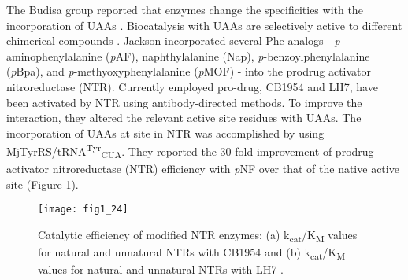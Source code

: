 \begin{refsection}
The Budisa group reported that enzymes change the specificities with the
incorporation of UAAs \cite{Budisa2006}. Biocatalysis with UAAs
are selectively active to different chimerical compounds \cite{Jackson2006a}.
Jackson  incorporated several Phe analogs -
\emph{p}-aminophenylalanine (\emph{p}AF), naphthylalanine (Nap),
\emph{p}-benzoylphenylalanine (\emph{p}Bpa), and \emph{p}-methyoxyphenylalanine
(\emph{p}MOF) - into the prodrug activator nitroreductase (NTR). Currently
employed pro-drug, CB1954 and LH7, have been activated by NTR using
antibody-directed methods. To improve the interaction, they altered the
relevant active site residues with UAAs. The incorporation of UAAs at site in
NTR was accomplished by using
MjTyrRS/tRNA\textsuperscript{Tyr}\textsubscript{CUA}. They reported the 30-fold
improvement of prodrug activator nitroreductase (NTR) efficiency with
\emph{p}NF over that of the native active site\cite{Jackson2006a} (Figure
\ref{fig:selectivity-example}).
\begin{figure}[htbp] \centering \texttt{[image: fig1\_24]}
    \caption[Catalytic efficiency of modified NTR enzymes: (a)
        k\textsubscript{cat}/K\textsubscript{M} values for natural and
        unnatural NTRs with CB1954 and (b)
        k\textsubscript{cat}/K\textsubscript{M} values for natural and
    unnatural NTRs with LH7.]{Catalytic efficiency of modified NTR enzymes: (a)
        k\textsubscript{cat}/K\textsubscript{M} values for natural and
        unnatural NTRs with CB1954 and (b)
        k\textsubscript{cat}/K\textsubscript{M} values for natural and
        unnatural NTRs with LH7 \cite{Jackson2006a}.} 
        \label{fig:selectivity-example}
\end{figure}


\end{refsection}
